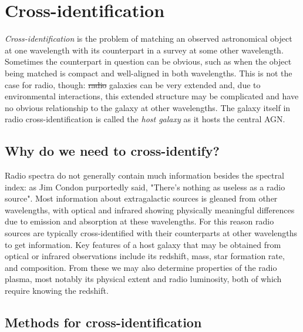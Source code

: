 \documentclass[11pt, a4paper]{book}
\newcommand{\defn}[1]{\emph{#1}}
\providecommand{\DIFaddtex}[1]{{\protect\color{blue}\uwave{#1}}} %
\providecommand{\DIFdeltex}[1]{{\protect\color{red}\sout{#1}}}                      %
\providecommand{\DIFaddbegin}{} %
\providecommand{\DIFaddend}{} %
\providecommand{\DIFdelbegin}{} %
\providecommand{\DIFdelend}{} %
\providecommand{\DIFadd}[1]{\texorpdfstring{\DIFaddtex{#1}}{#1}} %
\providecommand{\DIFdel}[1]{\texorpdfstring{\DIFdeltex{#1}}{}} %
\newcommand{\DIFscaledelfig}{0.5}
\newlength{\DIFdelgraphicswidth} %
\newlength{\DIFdelgraphicsheight} %
\newcommand{\DIFaddincludegraphics}[2][]{{\color{blue}\fbox{\DIFOincludegraphics[#1]{#2}}}} %
\newcommand{\DIFdelincludegraphics}[2][]{%
\sbox{\DIFdelgraphicsbox}{\DIFOincludegraphics[#1]{#2}}%
\settoboxwidth{\DIFdelgraphicswidth}{\DIFdelgraphicsbox} %
\settoboxtotalheight{\DIFdelgraphicsheight}{\DIFdelgraphicsbox} %
\scalebox{\DIFscaledelfig}{%
\parbox[b]{\DIFdelgraphicswidth}{\usebox{\DIFdelgraphicsbox}\\[-\baselineskip] \rule{\DIFdelgraphicswidth}{0em}}\llap{\resizebox{\DIFdelgraphicswidth}{\DIFdelgraphicsheight}{%
\setlength{\unitlength}{\DIFdelgraphicswidth}%
\begin{picture}(1,1)%
\thicklines\linethickness{2pt} %
{\color[rgb]{1,0,0}\put(0,0){\framebox(1,1){}}}%
{\color[rgb]{1,0,0}\put(0,0){\line( 1,1){1}}}%
{\color[rgb]{1,0,0}\put(0,1){\line(1,-1){1}}}%
\end{picture}%
}\hspace*{3pt}}} %
} %
\DeclareRobustCommand{\DIFaddbegin}{\DIFOaddbegin \let\includegraphics\DIFaddincludegraphics} %
\DeclareRobustCommand{\DIFaddend}{\DIFOaddend \let\includegraphics\DIFOincludegraphics} %
\DeclareRobustCommand{\DIFdelbegin}{\DIFOdelbegin \let\includegraphics\DIFdelincludegraphics} %
\DeclareRobustCommand{\DIFdelend}{\DIFOaddend \let\includegraphics\DIFOincludegraphics} %
\begin{document}
\section{Cross-identification}
\label{sec:xid}

    \defn{Cross-identification} is the problem of matching an observed astronomical object at one wavelength with its counterpart in a survey at some other wavelength. Sometimes the counterpart in question can be obvious, such as when the object being matched is compact and well-aligned in both wavelengths. This is not the case for radio, though: \DIFdelbegin \DIFdel{radio }\DIFdelend \DIFaddbegin \DIFadd{Radio }\DIFaddend galaxies can be very extended and, due to environmental interactions, this extended structure may be complicated and have no obvious relationship to the galaxy at other wavelengths. The galaxy itself in radio cross-identification is called the \defn{host galaxy} as it hosts the central AGN.

    \subsection{Why do we need to cross-identify?}
    \label{sec:xid-why}

        Radio spectra do not generally contain much information besides the spectral index: as Jim Condon purportedly said, "There's nothing as useless as a radio source". Most information about extragalactic sources is gleaned from other wavelengths, with optical and infrared showing physically meaningful differences due to emission and absorption at these wavelengths. For this reason radio sources are typically cross-identified with their counterparts at other wavelengths to get information. Key features of a host galaxy that may be obtained from optical or infrared observations include its redshift, mass, star formation rate, and composition. From these we may also determine properties of the radio plasma, most notably its physical extent and radio luminosity, both of which require knowing the redshift.

    \subsection{Methods for cross-identification}
    \label{sec:xid-how}
\end{document}
